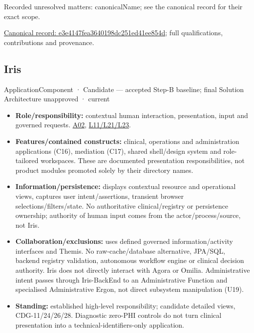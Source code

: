 {\small Recorded unresolved matters: canonicalName; see the canonical record for their exact scope.}\par
{\footnotesize \href{../../../../continuum/application/application-component/e3e4147fea3640198dc251ed41ee854d.md}{Canonical record: e3e4147fea3640198dc251ed41ee854d}; full qualifications, contributions and provenance.}\par
\subsection{Iris}

\label{element:e927c1af96c64fcd979be659bee2cbe3}
{\small ApplicationComponent · Candidate — accepted Step-B baseline; final Solution Architecture unapproved · current}\par

\begin{itemize}


\item \textbf{Role/responsibility:} contextual human interaction, presentation, input and
  governed requests. \href{\detokenize{../../../../../docs/markdown/05-information-systems-architecture/sources.md#a02}}{A02}, \href{\detokenize{../../../../../docs/markdown/05-information-systems-architecture/sources.md#l11}}{L11/L21/L23}.

\item \textbf{Features/contained constructs:} clinical, operations and administration
  applications (C16), mediation (C17), shared shell/design system and role-tailored
  workspaces. These are documented presentation responsibilities, not product modules
  promoted solely by their directory names.

\item \textbf{Information/persistence:} displays contextual resource and operational views,
  captures user intent/assertions, transient browser selections/filters/state.
  No authoritative clinical/registry or persistence ownership; authority of human
  input comes from the actor/process/source, not Iris.

\item \textbf{Collaboration/exclusions:} uses defined governed information/activity interfaces
  and Themis. No raw-cache/database alternative, JPA/SQL, backend registry validation,
  autonomous workflow engine or clinical decision authority.
  Iris does not directly interact with Agora or Omilia. Administrative intent
  passes through Iris-BackEnd to an Administrative Function and specialised
  Administrative Ergon, not direct subsystem manipulation (U19).

\item \textbf{Standing:} established high-level responsibility; candidate detailed views,
  CDG-11/24/26/28. Diagnostic zero-PHI controls do not turn clinical presentation
  into a technical-identifiers-only application.

\end{itemize}

